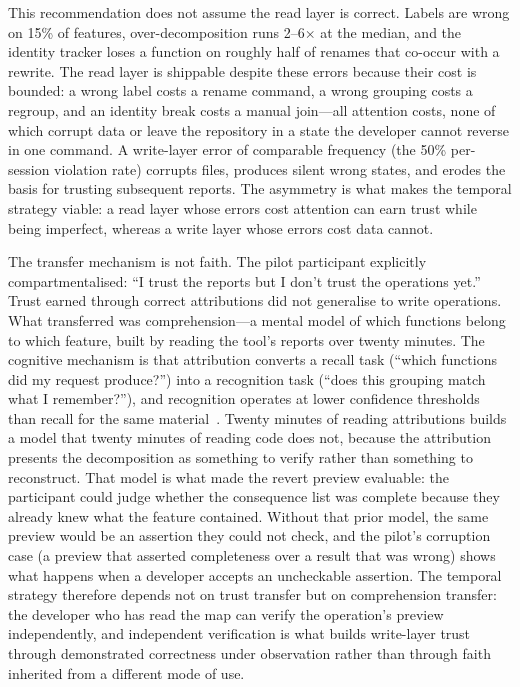 This recommendation does not assume the read layer is correct. Labels are wrong
on 15\% of features, over-decomposition runs 2--6$\times$ at the median, and the
identity tracker loses a function on roughly half of renames that co-occur with
a rewrite. The read layer is shippable despite these errors because their cost
is bounded: a wrong label costs a rename command, a wrong grouping costs a
regroup, and an identity break costs a manual join---all attention costs, none of
which corrupt data or leave the repository in a state the developer cannot
reverse in one command. A write-layer error of comparable frequency (the 50\%
per-session violation rate) corrupts files, produces silent wrong states, and
erodes the basis for trusting subsequent reports. The asymmetry is what makes the
temporal strategy viable: a read layer whose errors cost attention can earn trust
while being imperfect, whereas a write layer whose errors cost data cannot.

The transfer mechanism is not faith. The pilot participant explicitly
compartmentalised: ``I trust the reports but I don't trust the operations
yet.'' Trust earned through correct attributions did not generalise to write
operations. What transferred was comprehension---a mental model of which
functions belong to which feature, built by reading the tool's reports over
twenty minutes. The cognitive mechanism is that attribution converts a recall
task (``which functions did my request produce?'') into a recognition task
(``does this grouping match what I remember?''), and recognition operates at
lower confidence thresholds than recall for the same
material~\cite{mandler1980}. Twenty minutes of reading attributions builds a
model that twenty minutes of reading code does not, because the attribution
presents the decomposition as something to verify rather than something to
reconstruct. That model is what made the revert preview evaluable: the
participant could judge whether the consequence list was complete because they
already knew what the feature contained. Without that prior model, the same
preview would be an assertion they could not check, and the pilot's corruption
case (a preview that asserted completeness over a result that was wrong) shows
what happens when a developer accepts an uncheckable assertion. The temporal
strategy therefore depends not on trust transfer but on comprehension transfer:
the developer who has read the map can verify the operation's preview
independently, and independent verification is what builds write-layer trust
through demonstrated correctness under observation rather than through faith
inherited from a different mode of use.

